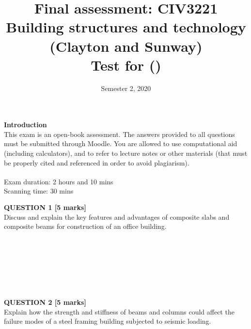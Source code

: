 \documentclass[a4paper,11pt]{article}
\title{Final assessment: CIV3221 Building structures and technology (Clayton and Sunway)\\Test for \VAR{FullName} (\VAR{StudentID})}
\date{Semester 2, 2020}
\begin{document}
\maketitle

\begin{introduction}	
\noindent
\textbf{Introduction}\\
\noindent
This exam is an open-book assessment. The answers provided to all questions must be submitted through Moodle. You are allowed to use computational aid (including calculators), and to refer to lecture notes or other materials (that must be properly cited and referenced in order to avoid plagiarism).\\
\\ 
\noindent
Exam duration: 2 hours and 10 mins\\
\noindent
Scanning time: 30 mins\\

\end{introduction}

\newpage
\noindent
\textbf{QUESTION 1 [5 marks]}\\
Discuss and explain the key features and advantages of composite slabs and composite beams for construction of an office building.\\
\\
\\
\\
\\
\\
\\
\\
\noindent
\textbf{QUESTION 2 [5 marks]}\\
Explain how the strength and stiffness of beams and columns could affect the failure modes of a steel framing building subjected to seismic loading.\\
\\
\\
\\
\\
\\
\\
\\
\end{document}

